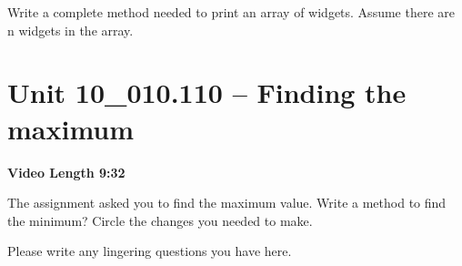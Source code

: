 \documentclass[letterpaper,12pt]{exam}
\newcommand{\unit}{Unit 10}
\begin{document}
\begin{questions}
\begin{samepage}
    \question Write a complete method needed to print an array of widgets.  Assume there are n widgets in the array.
    \vspace{55mm}
\end{samepage}

\section*{\unit\_010.110 -- Finding the maximum} 
\par{\selectfont\textbf{Video Length 9:32}}

\begin{samepage}
    \question The assignment asked you to find the maximum value.  Write a method to find the minimum?  Circle the changes you needed to make.
    \vspace{55mm}
\end{samepage}

Please write any lingering questions you have here.
\end{questions}
\end{document}
